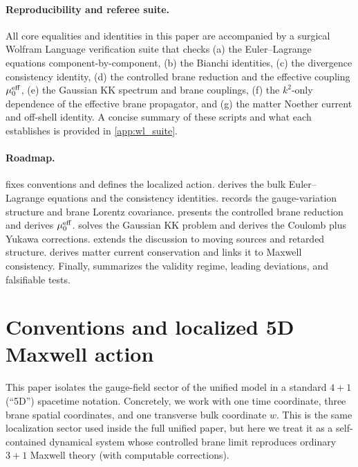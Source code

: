 \documentclass[11pt]{article}
\begin{document}
\paragraph{Reproducibility and referee suite.}
All core equalities and identities in this paper are accompanied by a surgical
Wolfram Language verification suite that checks (a) the Euler--Lagrange equations
component-by-component, (b) the Bianchi identities, (c) the divergence
consistency identity, (d) the controlled brane reduction and the effective
coupling \(\mu_0^{\rm eff}\), (e) the Gaussian KK spectrum and brane couplings,
(f) the \(k^2\)-only dependence of the effective brane propagator, and (g) the
matter Noether current and off-shell identity. A concise summary of these scripts
and what each establishes is provided in \cref{app:wl_suite}.

\paragraph{Roadmap.}
 fixes conventions and defines the localized action.
 derives the bulk Euler--Lagrange equations and the
consistency identities.  records the gauge-variation
structure and brane Lorentz covariance.  presents the
controlled brane reduction and derives \(\mu_0^{\rm eff}\).
 solves the Gaussian KK problem and derives the Coulomb plus
Yukawa corrections.  extends the discussion to moving
sources and retarded structure.  derives matter current
conservation and links it to Maxwell consistency. Finally,
 summarizes the validity regime, leading deviations, and
falsifiable tests.

\section{Conventions and localized 5D Maxwell action}
\label{sec:conventions_action}

This paper isolates the gauge-field sector of the unified model in a standard
\(4+1\) (``5D'') spacetime notation. Concretely, we work with one time coordinate,
three brane spatial coordinates, and one transverse bulk coordinate \(w\). This is
the same localization sector used inside the full unified paper, but here we treat
it as a self-contained dynamical system whose controlled brane limit reproduces
ordinary \(3+1\) Maxwell theory (with computable corrections).
\end{document}
